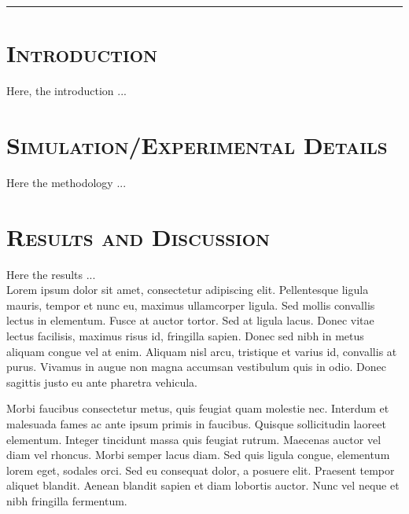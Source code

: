 \noindent \rule{\textwidth}{0.5pt}

\begin{multicols}{2}
\section{\textsc{Introduction}}
\label{sec:sec01}

Here, the introduction ...




\section{\textsc{Simulation/Experimental Details}}
\label{sec:sec02}

Here the methodology ...

\section{\textsc{Results and Discussion}}
\label{sec:sec03}

Here the results ...\\

 Lorem ipsum dolor sit amet,\cite{labelcite1} consectetur adipiscing elit. Pellentesque ligula 
mauris, tempor et nunc eu, maximus ullamcorper ligula.\cite{labelcite1,labelcite2,labelcite3} Sed mollis convallis 
lectus in elementum. Fusce at auctor tortor. Sed at ligula lacus. Donec vitae 
lectus facilisis, maximus risus id, fringilla sapien. Donec sed nibh in metus 
aliquam congue vel at enim.\cite{labelcite1,labelcite3,labelcite4,labelcite5} Aliquam nisl arcu, tristique et varius id, convallis 
at purus. Vivamus in augue non magna accumsan vestibulum quis in odio. Donec 
sagittis justo eu ante pharetra vehicula.

Morbi faucibus consectetur metus, quis feugiat quam molestie nec. Interdum et 
malesuada fames ac ante ipsum primis in faucibus. Quisque sollicitudin laoreet 
elementum. Integer tincidunt massa quis feugiat rutrum. Maecenas auctor vel diam 
vel rhoncus. Morbi semper lacus diam. Sed quis ligula congue, elementum lorem 
eget, sodales orci. Sed eu consequat dolor, a posuere elit. Praesent tempor 
aliquet blandit. Aenean blandit sapien et diam lobortis auctor. Nunc vel neque 
et nibh fringilla fermentum.\linebreak


\begin{figure}[H]
 \begin{center}
 

\end{center}
\end{figure}
\end{multicols}

